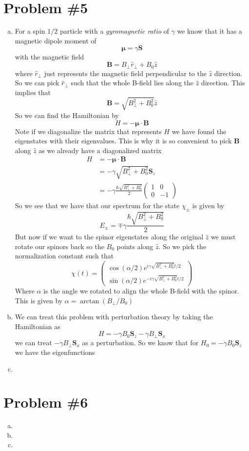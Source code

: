\documentclass[11pt]{article}
\numberwithin{equation}{section}
\begin{document}
\section{Problem \#5}
\begin{enumerate}[(a)]
\item
For a spin $1/2$ particle with a \emph{gyromagnetic ratio} of $\gamma$ we know that it has a magnetic dipole moment of 
$$\boldsymbol{\mu} = \gamma\boldsymbol{S}$$
with the magnetic field 
$$\boldsymbol{B} = B_{\perp}\hat{r}_{\perp} + B_0\hat{z}$$
where $\hat{r}_{\perp}$ just represents the magnetic field perpendicular to the $\hat{z}$ direction. So we can pick $\hat{r}_{\perp}$ such that the whole B-field lies along the $\hat{z}$ direction. This implies that
$$\boldsymbol{B} = \sqrt{B_{\perp}^2+B_0^2}\hat{z}$$
So we can find the Hamiltonian by
$$H = -\boldsymbol{\mu}\cdot\boldsymbol{B}$$
Note if we diagonalize the matrix that represents $H$ we have found the eigenstates with their eigenvalues. This is why it is so convenient to pick $\boldsymbol{B}$ along $\hat{z}$ as we already have a diagonalized matrix
\begin{align*}
H &= -\boldsymbol{\mu}\cdot\boldsymbol{B}\\
&= -\gamma\sqrt{B_{\perp}^2+B_0^2}\boldsymbol{S}_z\\
&= -\gamma \frac{\hbar\sqrt{B_{\perp}^2+B_0^2}}{2}\left(\begin{array}{cc}
                    1 &0\\
                    0 &-1\end{array}\right) 
\end{align*}
So we see that we have that our spectrum for the state $\chi_{\pm}$ is given by
$$E_{\pm} = \mp\gamma \frac{\hbar\sqrt{B_{\perp}^2+B_0^2}}{2}$$
But now if we want to the spinor eigenstates along the original $\hat{z}$ we must rotate our spinors back so the $B_0$ points along $\hat{z}$. So we pick the normalization constant such that
$$\chi(t) = \left(\begin{array}{c}
                   \cos(\alpha/2)e^{i\gamma\sqrt{B_{\perp}^2+B_0^2}t/2}\\
                   \sin(\alpha/2)e^{-i\gamma\sqrt{B_{\perp}^2+B_0^2}t/2}
                   \end{array}\right)$$
Where $\alpha$ is the angle we rotated to align the whole B-field with the spinor. This is given by $\alpha=\arctan(B_{\perp}/B_0)$

\item
We can treat this problem with perturbation theory by taking the Hamiltonian as 
$$H = -\gamma B_0\boldsymbol{S}_z-\gamma B_{\perp}\boldsymbol{S}_x$$
we can treat $-\gamma B_{\perp}\boldsymbol{S}_x$ as a perturbation. So we know that for $H_0 = -\gamma B_0\boldsymbol{S}_z$ we have the eigenfunctions
\item
\end{enumerate}

\section{Problem \#6}
\begin{enumerate}[(a)]
\item
\item
\item
\end{enumerate}
\end{document}
